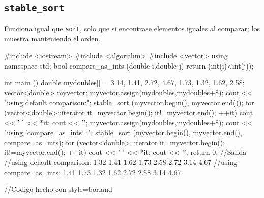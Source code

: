 \documentclass[a4paper,11pt]{article}
\begin{document}
\subsection*{\texttt{stable\_sort}}
Funciona igual que \texttt{sort}, solo que si encontrase elementos iguales al comparar; los muestra manteniendo el orden.
\begin{pyglist}[language=c++,caption={bitset},listingname={\textbf{Ejemplo}},style=borland]
#include <iostream>
#include <algorithm>
#include <vector>
using namespace std;
bool compare_as_ints (double i,double j){
  return (int(i)<int(j));
}

int main () {
  double mydoubles[] = {3.14, 1.41, 2.72, 4.67, 1.73, 1.32, 1.62, 2.58};
  vector<double> myvector;
  myvector.assign(mydoubles,mydoubles+8);
  cout << "using default comparison:";
  stable_sort (myvector.begin(), myvector.end());
  for (vector<double>::iterator it=myvector.begin(); it!=myvector.end(); ++it)
    cout << ' ' << *it;
  cout << '\n';
  myvector.assign(mydoubles,mydoubles+8);
  cout << "using 'compare_as_ints' :";
  stable_sort (myvector.begin(), myvector.end(), compare_as_ints);
  for (vector<double>::iterator it=myvector.begin(); it!=myvector.end(); ++it)
    cout << ' ' << *it;
  cout << '\n';
  return 0;
}
//Salida
//using default comparison: 1.32 1.41 1.62 1.73 2.58 2.72 3.14 4.67
//using compare\_as\_ints: 1.41 1.73 1.32 1.62 2.72 2.58 3.14 4.67

//Codigo hecho con style=borland
\end{pyglist}
\end{document}
